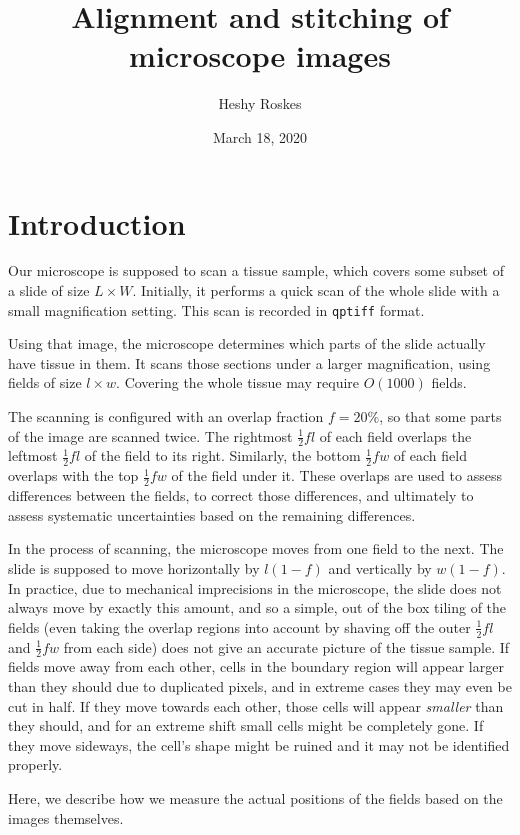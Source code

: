 \documentclass{article}
\begin{document}
	
\title{Alignment and stitching of microscope images}
\author{Heshy Roskes}
\date{March 18, 2020}

\section{Introduction}

Our microscope is supposed to scan a tissue sample, which covers some subset of a slide of size $L\times W$.  Initially, it performs a quick scan of the whole slide with a small magnification setting.  This scan is recorded in \texttt{qptiff} format.

Using that image, the microscope determines which parts of the slide actually have tissue in them.  It scans those sections under a larger magnification, using fields of size $l\times w$.  Covering the whole tissue may require $O(1000)$ fields.

The scanning is configured with an overlap fraction $f=20\%$, so that some parts of the image are scanned twice.  The rightmost $\frac{1}{2}fl$ of each field overlaps the leftmost $\frac{1}{2}fl$ of the field to its right.  Similarly, the bottom $\frac{1}{2}fw$ of each field overlaps with the top $\frac{1}{2}fw$ of the field under it.  These overlaps are used to assess differences between the fields, to correct those differences, and ultimately to assess systematic uncertainties based on the remaining differences.

In the process of scanning, the microscope moves from one field to the next.   The slide is supposed to move horizontally by $l(1-f)$ and vertically by $w(1-f)$.  In practice, due to mechanical imprecisions in the microscope, the slide does not always move by exactly this amount, and so a simple, out of the box tiling of the fields (even taking the overlap regions into account by shaving off the outer $\frac{1}{2}fl$ and $\frac{1}{2}fw$ from each side) does not give an accurate picture of the tissue sample.  If fields move away from each other, cells in the boundary region will appear larger than they should due to duplicated pixels, and in extreme cases they may even be cut in half.  If they move towards each other, those cells will appear \emph{smaller} than they should, and for an extreme shift small cells might be completely gone.  If they move sideways, the cell's shape might be ruined and it may not be identified properly.

Here, we describe how we measure the actual positions of the fields based on the images themselves.
\end{document}
